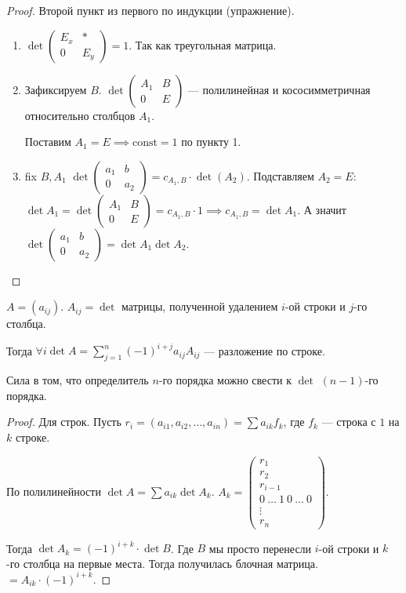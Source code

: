 \begin{proof}
    Второй пункт из первого по индукции (упражнение).

    \begin{enumerate}
        \item $\det \left( \begin{array}{c|c} E_x & \ast \\ \hline 0 & E_y \end{array}\right) = 1$. Так как треугольная матрица.
        \item Зафиксируем  $B$.  $\det \left( \begin{array}{c|c} A_1 & B \\ \hline 0 & E\end{array} \right)$ --- полилинейная и кососимметричная относительно столбцов  $A_1$.

            Поставим $A_1 = E \implies \text{const} = 1$ по пункту 1.
        \item fix $B, A_1$  $\det\left(\begin{array}{c|c} a_1 & b \\ \hline 0 & a_2 \end{array} \right) = c_{A_1, B} \cdot \det(A_2)$. Подставляем  $A_2 = E$:  $\det A_1 = \det\left(\begin{array}{c|c} A_1 & B \\ \hline 0 & E \end{array} \right) = c_{A_1, B} \cdot 1 \implies c_{A_1, B} = \det A_1$. А значит $\det\left(\begin{array}{c|c} a_1 & b \\ \hline 0 & a_2 \end{array} \right) = \det A_1 \det A_2$.
    \end{enumerate}
\end{proof}
\begin{theorem}
    $A = (a_{ij})$.  $A_{ij} = \det$ матрицы, полученной удалением  $i$-ой строки и  $j$-го столбца.

    Тогда  $\forall i \det A = \sum\limits_{j=1}^n (-1)^{i+j} a_{ij} A_{ij}$ --- разложение по строке.


    Сила в том, что определитель  $n$-го порядка можно свести к  $\det$  $(n-1)$-го порядка.
\end{theorem}
\begin{proof}
    Для строк. Пусть $r_i = (a_{i1}, a_{i 2}, \ldots, a_{in}) = \sum a_{ik}f_k$, где $f_k$ --- строка с  $1$ на  $k$ строке.

    По полилинейности  $\det A = \sum a_{ik} \det A_k$.  $A_k = \begin{pmatrix} r_1 \\ r_2 \\ r_{i-1} \\ 0\ \ldots\ 1\ 0\ \ldots\ 0 \\ \vdots \\ r_n \end{pmatrix}$.

        Тогда $\det A_k = (-1)^{i+k} \cdot \det B$. Где  $B$ мы просто перенесли  $i$-ой строки и  $k$-го столбца на первые места. Тогда получилась блочная матрица.  $= A_{ik} \cdot (-1)^{i+k}$.
\end{proof}

